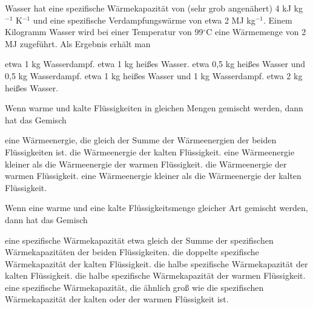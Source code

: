 \documentclass[11pt]{exam}
\begin{document}
\setlength{\voffset}{-0.5in}
\setlength{\headsep}{5pt}

\hspace{2mm}
 \hspace{5mm}
\vspace{4mm}

\begin{questions}

\question Wasser hat eine spezifische Wärmekapazität von (sehr grob angenähert) 4 kJ kg\(^{-1}\) K\(^{-1}\) und eine spezifische Verdampfungswärme von etwa 2 MJ kg\(^{-1}\). Einem Kilogramm Wasser wird bei einer Temperatur von 99\(^\circ\)C eine Wärmemenge von 2 MJ zugeführt. Als Ergebnis erhält man

\begin{choices}
	\choice etwa 1 kg Wasserdampf.
	\choice etwa 1 kg heißes Wasser.
	\choice etwa 0,5 kg heißes Wasser und 0,5 kg Wasserdampf.
	\choice etwa 1 kg heißes Wasser und 1 kg Wasserdampf.
	\choice etwa 2 kg heißes Wasser.
\end{choices}

\vspace{3mm}\question Wenn warme und kalte Flüssigkeiten in gleichen Mengen gemischt werden, dann hat das Gemisch

\begin{choices}
	\choice eine Wärmeenergie, die gleich der Summe der Wärmeenergien der beiden Flüssigkeiten ist.
	\choice die Wärmeenergie der kalten Flüssigkeit.
	\choice eine Wärmeenergie kleiner als die Wärmeenergie der warmen Flüssigkeit.
	\choice die Wärmeenergie der warmen Flüssigkeit.
	\choice eine Wärmeenergie kleiner als die Wärmeenergie der kalten Flüssigkeit.
\end{choices}

\vspace{3mm}\question Wenn eine warme und eine kalte Flüssigkeitsmenge gleicher Art gemischt werden, dann hat das Gemisch

\begin{choices}
	\choice eine spezifische Wärmekapazität etwa gleich der Summe der spezifischen Wärmekapazitäten der beiden Flüssigkeiten.
	\choice die doppelte spezifische Wärmekapazität der kalten Flüssigkeit.
	\choice die halbe spezifische Wärmekapazität der kalten Flüssigkeit.
	\choice die halbe spezifische Wärmekapazität der warmen Flüssigkeit.
	\choice eine spezifische Wärmekapazität, die ähnlich groß wie die spezifischen Wärmekapazität der kalten oder der warmen Flüssigkeit ist.
\end{choices}


\end{questions}
\end{document}
